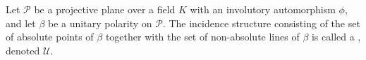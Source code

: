 Let $\mathcal{P}$ be a projective plane over a field $K$ with an involutory automorphism $\phi$, and let $\beta$ be a unitary polarity on $\mathcal{P}$. The incidence structure consisting of the set of absolute points of $\beta$ together with the set of non-absolute lines of $\beta$ is called a , denoted $\mathcal{U}$.
